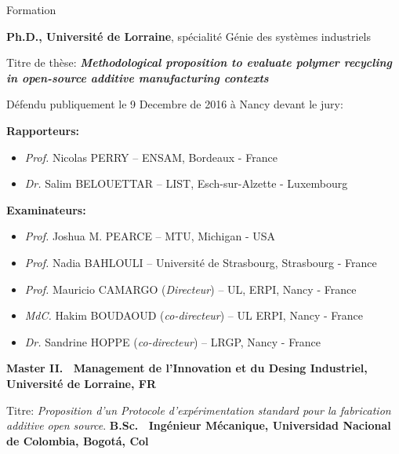 


\begin{rubric}{Formation}

\entry*[2013 -- 2016]%
	\textbf{Ph.D., Université de Lorraine}, spécialité Génie des systèmes industriels \par
	Titre de thèse: \textbf{\emph{Methodological proposition to evaluate polymer recycling in open-source additive manufacturing contexts}} 
	
	Défendu publiquement le 9 Decembre de 2016 à Nancy devant le jury:


	\textbf{Rapporteurs:}
	\begin{itemize}
	\setlength\itemsep{-0.3em}
	    \item \textit{Prof.} Nicolas PERRY --  ENSAM, Bordeaux - France
	    \item \textit{Dr.} Salim BELOUETTAR -- LIST, Esch-sur-Alzette - Luxembourg
	\end{itemize}


	\textbf{Examinateurs:}
	\begin{itemize}
	\setlength\itemsep{-0.3em}
	    \item \textit{Prof.} Joshua M. PEARCE -- MTU, Michigan - USA
	    \item \textit{Prof.} Nadia BAHLOULI -- Université de Strasbourg, Strasbourg - France
	    \item \textit{Prof.} Mauricio CAMARGO (\textit{Directeur}) -- UL, ERPI, Nancy - France
	    
	    \item \textit{MdC.} Hakim BOUDAOUD (\textit{co-directeur}) -- UL ERPI, Nancy - France
	    
	    \item \textit{Dr.} Sandrine HOPPE (\textit{co-directeur})  --  LRGP, Nancy - France
	\end{itemize}
	
	

\entry*[2012 -- 2013]%
	\textbf{Master II.~ Management de l'Innovation et du Desing Industriel, Université de Lorraine, FR} \par Titre: \emph{Proposition d'un Protocole d'expérimentation standard pour la fabrication additive open source}.
%
\entry*[2004 -- 2012]%
	\textbf{B.Sc.~ Ingénieur Mécanique, Universidad Nacional de Colombia, Bogotá, Col}\par
\end{rubric}



